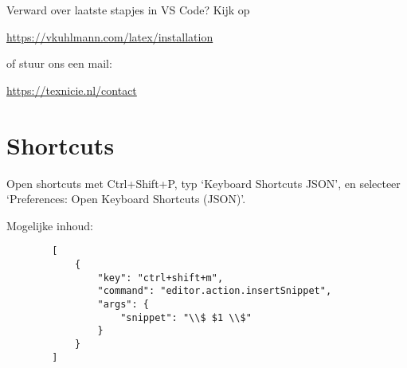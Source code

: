 \documentclass[
    dutch,
    everyoneauthor=true,
    defaultSlideCollection=vincent,
    handout
]{../../cursuspresentatie}
\let\placetarget\relax
\let\placetarget\relax
\begin{document}




\begin{frame}
    \begin{center}
        \large
        Verward over laatste stapjes in VS Code?
        Kijk op 
        
        \url{https://vkuhlmann.com/latex/installation}
        
        of stuur ons een mail:
        
        \url{https://texnicie.nl/contact}
    \end{center}
\end{frame}


\section{Shortcuts}

\def\placetarget{\hypertarget{shortcuts}{}}

\begin{frame}[fragile]
    Open shortcuts met Ctrl+Shift+P, typ `Keyboard Shortcuts JSON', en selecteer
    `Preferences: Open Keyboard Shortcuts (JSON)'.


    Mogelijke inhoud:
    \begin{verbatim}
        [
            {
                "key": "ctrl+shift+m",
                "command": "editor.action.insertSnippet",
                "args": {
                    "snippet": "\\$ $1 \\$"
                }
            }
        ]
    \end{verbatim}
\end{frame}
\end{document}
